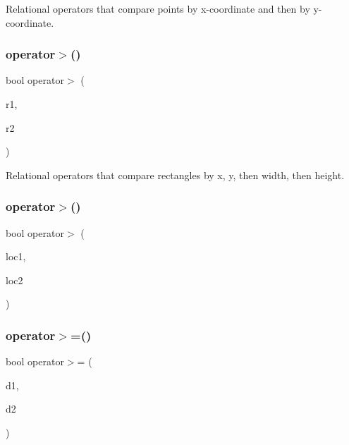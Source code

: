 Relational operators that compare points by x-\/coordinate and then by y-\/coordinate. 

\mbox{\label{namespacesgl_a99b0e23f34dced98f43fd0250c9cdf40}} 
\subsubsection{\texorpdfstring{operator$>$()}{operator>()}\hspace{0.1cm}{\footnotesize\ttfamily [3/4]}}
{\footnotesize\ttfamily bool operator$>$ (\begin{DoxyParamCaption}\item[{const \mbox{\hyperlink{structsgl_1_1GRectangle}{G\+Rectangle}} \&}]{r1,  }\item[{const \mbox{\hyperlink{structsgl_1_1GRectangle}{G\+Rectangle}} \&}]{r2 }\end{DoxyParamCaption})}



Relational operators that compare rectangles by x, y, then width, then height. 

\mbox{\label{namespacesgl_a869b9fcf9f79581d2a5f7e559bed8618}} 
\subsubsection{\texorpdfstring{operator$>$()}{operator>()}\hspace{0.1cm}{\footnotesize\ttfamily [4/4]}}
{\footnotesize\ttfamily bool operator$>$ (\begin{DoxyParamCaption}\item[{const \mbox{\hyperlink{structsgl_1_1GTableIndex}{G\+Table\+Index}} \&}]{loc1,  }\item[{const \mbox{\hyperlink{structsgl_1_1GTableIndex}{G\+Table\+Index}} \&}]{loc2 }\end{DoxyParamCaption})}

\mbox{\label{namespacesgl_a52915605adf1b94cbc876aa6b819b70d}} 
\subsubsection{\texorpdfstring{operator$>$=()}{operator>=()}\hspace{0.1cm}{\footnotesize\ttfamily [1/4]}}
{\footnotesize\ttfamily bool operator$>$= (\begin{DoxyParamCaption}\item[{const \mbox{\hyperlink{structsgl_1_1GDimension}{G\+Dimension}} \&}]{d1,  }\item[{const \mbox{\hyperlink{structsgl_1_1GDimension}{G\+Dimension}} \&}]{d2 }\end{DoxyParamCaption})}




